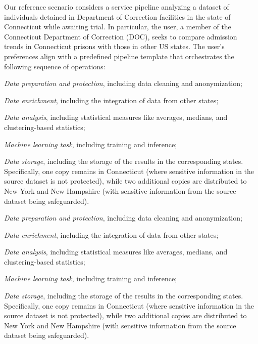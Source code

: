 Our reference scenario considers a service pipeline analyzing a dataset of individuals detained in Department of Correction facilities in the state of Connecticut while awaiting trial. In particular, the user, a member of the Connecticut Department of Correction (DOC), seeks to compare admission trends in Connecticut prisons with those in other US states.
The user's preferences align with a predefined pipeline template that orchestrates the following sequence of operations:
\begin{enumerate*}[label=(\roman*)]
  \item \emph{Data preparation and protection}, including data cleaning and anonymization;
  \item \emph{Data enrichment}, including the integration of data from other states;
  \item \emph{Data analysis}, including statistical measures like averages, medians, and clustering-based statistics;
  \item \emph{Machine learning task}, including training and inference;
  \item \emph{Data storage}, including the storage of the results in the corresponding states. Specifically, one copy remains in Connecticut (where sensitive information in the source dataset is not protected),
        while two additional copies are distributed to New York and New Hampshire (with sensitive information from the source dataset being safeguarded).
\end{enumerate*}

\begin{enumerate*}[label=(\roman*)]
  \item \emph{Data preparation and protection}, including data cleaning and anonymization;
  \item \emph{Data enrichment}, including the integration of data from other states;
  \item \emph{Data analysis}, including statistical measures like averages, medians, and clustering-based statistics;
  \item \emph{Machine learning task}, including training and inference;
  \item \emph{Data storage}, including the storage of the results in the corresponding states. Specifically, one copy remains in Connecticut (where sensitive information in the source dataset is not protected),
        while two additional copies are distributed to New York and New Hampshire (with sensitive information from the source dataset being safeguarded).
\end{enumerate*}


